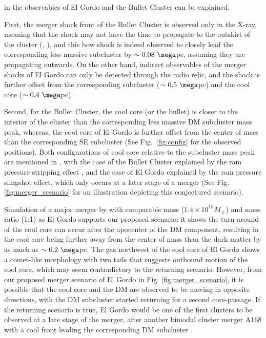in the observables of El Gordo and the Bullet Cluster can be explained.\par
First, the merger shock front of the Bullet Cluster is
observed only in the X-ray, meaning that the shock may not have the
time to propagate to the outskirt of the cluster (\citealt{Bruggen2011},
\citealt{Markevitch2007}), and this bow shock is indeed observed to closely
lead the corresponding less massive subcluster by $\sim 0.08~\mega$pc,
assuming they are propagating outwards. On the other hand, indirect observables of the merger
shocks of El Gordo can only be detected through the radio relic, and the shock is
further offset from the corresponding subcluster ($\sim 0.5~\mega$pc) and
the cool core ($\sim 0.4~\mega$pc). \par
Second, for the Bullet Cluster, the cool core (or the bullet) is closer to the
interior of the cluster than the corresponding less massive DM subcluster mass
peak, whereas, the cool core of El Gordo is further offset from the center of
mass than the corresponding SE subcluster (See Fig.~\ref{fig:config} for
the observed positions). 
Both configurations of cool core relative to the subcluster mass peak are
mentioned in \cite{Markevitch2007}, with the case of the Bullet Cluster
explained by the ram pressure stripping effect , and the case of El Gordo
explained by the ram pressure slingshot effect, which only occurs at a
later stage of a merger (See Fig. \ref{fig:merger_scenario} for an
illustration depicting this conjectured scenario).\par 
Simulation of a major merger by
\cite{Mathis05} with comparable mass ($1.4 \times 10^{15} M_{\sun}$) and
mass ratio (1:1) as El Gordo supports
our proposed scenario: it shows the turn-around of the cool core can occur after the
apocenter of the DM component, resulting in the cool core being further
away from the center of mass than the dark matter by as much as $\sim
0.2~\mega$pc.  The gas northwest of the cool core of El Gordo shows a comet-like
morphology with two tails that suggests outbound motion of the cool core, which may seem
contradictory to the returning scenario. However, from our proposed merger
scenario of El Gordo in Fig. \ref{fig:merger_scenario},
it is possible that the cool core and the DM are observed to be moving in
opposite directions, with the DM subcluster started returning for a second core-passage. If the returning scenario is true, El Gordo would be one of the first
clusters to be observed at a late stage of the merger, after another
bimodal cluster merger A168 with a cool front leading the corresponding DM
subcluster \citep{Hallman04}.

